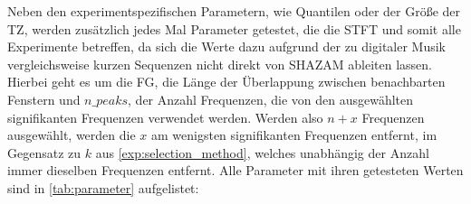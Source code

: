         Neben den experimentspezifischen Parametern, wie Quantilen oder der Größe der \acl{TZ}, werden zusätzlich jedes Mal Parameter getestet, die die \ac{STFT} und somit alle Experimente betreffen, da sich die Werte dazu aufgrund der zu digitaler Musik vergleichsweise kurzen Sequenzen nicht direkt von SHAZAM ableiten lassen. Hierbei geht es um die \ac{FG}, die Länge der Überlappung zwischen benachbarten Fenstern und $n\_peaks$, der Anzahl Frequenzen, die von den ausgewählten signifikanten Frequenzen verwendet werden. Werden also $n+x$ Frequenzen ausgewählt, werden die $x$ am wenigsten signifikanten Frequenzen entfernt, im Gegensatz zu $k$ aus \autoref{exp:selection_method}, welches unabhängig der Anzahl immer dieselben Frequenzen entfernt. Alle Parameter mit ihren getesteten Werten sind in \autoref{tab:parameter} aufgelistet:
        
